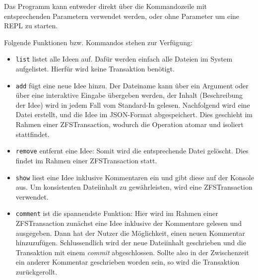 \documentclass[12pt]{article}
\begin{document}
Das Programm kann entweder direkt über die Kommandozeile mit entsprechenden Parametern verwendet werden, oder ohne Parameter um eine REPL zu starten.

Folgende Funktionen bzw. Kommandos stehen zur Verfügung:
\begin{itemize}
	\item \texttt{list} listet alle Ideen auf. Dafür werden einfach alle Dateien im System aufgelistet. Hierfür wird keine Transaktion benötigt.
	\item \texttt{add} fügt eine neue Idee hinzu. 
	Der Dateiname kann über ein Argument oder über eine interaktive Eingabe übergeben werden, der Inhalt (Beschreibung der Idee) wird in jedem Fall vom Standard-In gelesen.
	Nachfolgend wird eine Datei erstellt, und die Idee im JSON-Format abgespeichert.
	Dies geschieht im Rahmen einer ZFSTransaction, wodurch die Operation atomar und isoliert stattfindet.
	\item \texttt{remove} entfernt eine Idee: Somit wird die entsprechende Datei gelöscht.
	Dies findet im Rahmen einer ZFSTransaction statt.
	\item \texttt{show} liest eine Idee inklusive Kommentaren ein und gibt diese auf der Konsole aus.
	Um konsistenten Dateiinhalt zu gewährleisten, wird eine ZFSTransaction verwendet.
	\item \texttt{comment} ist die spannendste Funktion:
	Hier wird im Rahmen einer ZFSTransaction zunächst eine Idee inklusive der Kommentare gelesen und ausgegeben. Dann hat der Nutzer die Möglichkeit, einen neuen Kommentar hinzuzufügen.
	Schlussendlich wird der neue Dateiinhalt geschrieben und die Transaktion mit einem \emph{commit} abgeschlossen.
	Sollte also in der Zwischenzeit ein anderer Kommentar geschrieben worden sein, so wird die Transaktion zurückgerollt.
	
\end{itemize}
\end{document}
